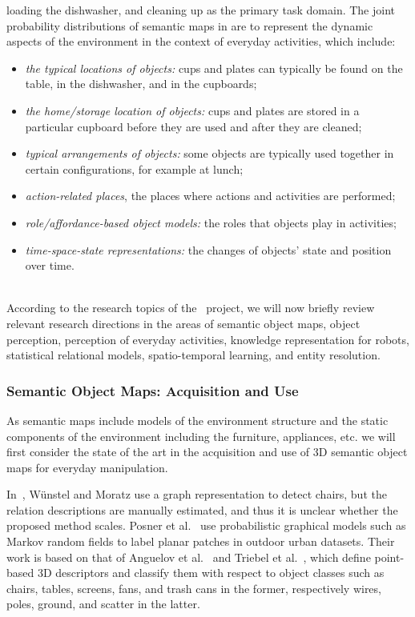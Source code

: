 loading  the  dishwasher,  and cleaning up as the primary task domain.
The joint probability distributions of semantic maps in \ksem are to represent the
dynamic aspects of the environment in the context of everyday
activities, which include:
\begin{itemize}
\item \emph{the typical locations of objects:} cups and plates can
  typically be found on the table, in the dishwasher, and in the
  cupboards;
\item \emph{the home/storage location of objects:} cups and plates are
  stored in a particular cupboard before they are used and after they
  are cleaned;
\item \emph{typical arrangements of objects:} some objects are
  typically used together in certain configurations, for example
  at lunch; %
\item \emph{action-related places}, the places where actions and
  activities are performed;
\item \emph{role/affordance-based object models:} the roles that
  objects play in activities;
\item \emph{time-space-state representations:} the changes of
  objects' state and position over time.
\end{itemize}

\\
According to the research topics of the \ksem\ project, we will now
briefly review relevant research directions in the areas of semantic
object maps, object perception, perception of everyday activities,
knowledge representation for robots, statistical relational models,
spatio-temporal learning, and entity resolution.
\subsubsection{Semantic Object Maps: Acquisition and Use}
\label{sec:soms}
As semantic maps include models of the environment structure and the static
components of the environment including the furniture, appliances,
etc. we will first consider the state of the art in the acquisition
and use of 3D semantic object maps for everyday manipulation.

In~\cite{ObjectsOffice}, W\"unstel and Moratz use a graph
representation to detect chairs, but the relation descriptions are
manually estimated, and thus it is unclear whether the proposed method
scales. Posner et al.~\cite{PosnerCumminsNewman08} use probabilistic
graphical models such as Markov random fields to label planar patches
in outdoor urban datasets. Their work is based on that of Anguelov et
al.~\cite{Anguelov05discriminativelearning} and Triebel et
al.~\cite{TriebelAMN07}, which define point-based 3D descriptors and
classify them with respect to object classes such as chairs, tables,
screens, fans, and trash cans in the former, %
respectively wires, poles, ground, and scatter in the
latter.%

